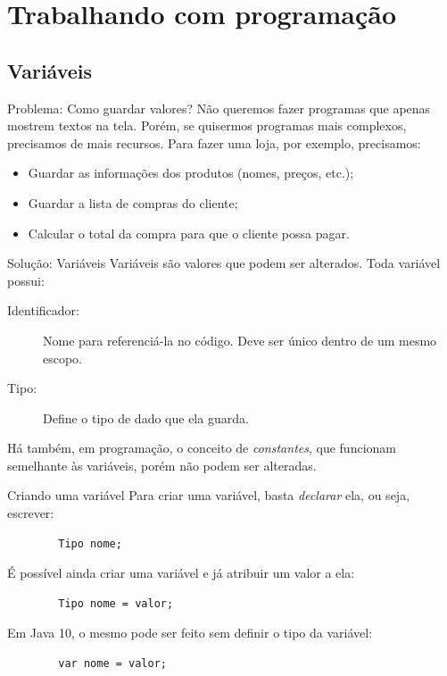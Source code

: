 \documentclass{beamer}
\begin{document}
\section{Trabalhando com programação}

\subsection{Variáveis}
\begin{frame}{Problema: Como guardar valores?}
    Não queremos fazer programas que apenas mostrem textos na tela. Porém, se
    quisermos programas mais complexos, precisamos de mais recursos.
    Para fazer uma loja, por exemplo, precisamos:

    \begin{itemize}
        \item Guardar as informações dos produtos (nomes, preços, etc.);
        \item Guardar a lista de compras do cliente;
        \item Calcular o total da compra para que o cliente possa pagar.
    \end{itemize}
\end{frame}

\begin{frame}{Solução: Variáveis}
    Variáveis são valores que podem ser alterados. Toda variável possui:
    \begin{description}
        \item[Identificador:] Nome para referenciá-la no código. Deve ser único
            dentro de um mesmo escopo.
        \item[Tipo:] Define o tipo de dado que ela guarda.
    \end{description}

    Há também, em programação, o conceito de \emph{constantes}, que funcionam
    semelhante às variáveis, porém não podem ser alteradas.
\end{frame}


\begin{frame}[fragile]{Criando uma variável}
    Para criar uma variável, basta \emph{declarar} ela, ou seja, escrever:

    \begin{verbatim}
        Tipo nome;
    \end{verbatim}

    É possível ainda criar uma variável e já atribuir um valor a ela:

    \begin{verbatim}
        Tipo nome = valor;
    \end{verbatim}

    Em Java 10, o mesmo pode ser feito sem definir o tipo da variável:

    \begin{verbatim}
        var nome = valor;
    \end{verbatim}
\end{frame}
\end{document}

